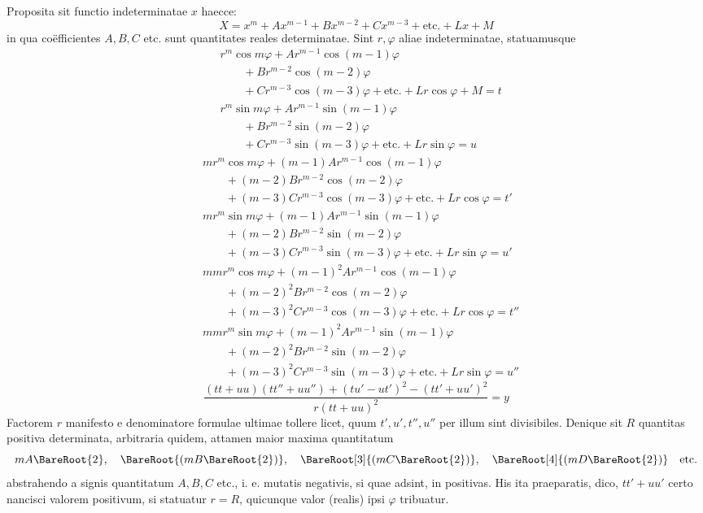 Proposita sit functio indeterminatae $x$ haecce:
\[
X=x^m+Ax^{m-1}+Bx^{m-2}+Cx^{m-3}+\text{etc.}+Lx+M
\]
in qua coëfficientes $A,B,C$ etc. sunt quantitates reales determinatae. Sint $r,\varphi$
aliae indeterminatae, statuamusque
\[
\begin{aligned}
&r^m\cos m\varphi+Ar^{m-1}\cos(m-1)\varphi\\
&\qquad+Br^{m-2}\cos(m-2)\varphi\\
&\qquad+Cr^{m-3}\cos(m-3)\varphi+\text{etc.}+Lr\cos\varphi+M=t\\
&r^m\sin m\varphi+Ar^{m-1}\sin(m-1)\varphi\\
&\qquad+Br^{m-2}\sin(m-2)\varphi\\
&\qquad+Cr^{m-3}\sin(m-3)\varphi+\text{etc.}+Lr\sin\varphi=u
\end{aligned}
\]
\[
\begin{aligned}
&mr^m\cos m\varphi+(m-1)Ar^{m-1}\cos(m-1)\varphi\\
&\qquad+(m-2)Br^{m-2}\cos(m-2)\varphi\\
&\qquad+(m-3)Cr^{m-3}\cos(m-3)\varphi+\text{etc.}+Lr\cos\varphi=t'\\
&mr^m\sin m\varphi+(m-1)Ar^{m-1}\sin(m-1)\varphi\\
&\qquad+(m-2)Br^{m-2}\sin(m-2)\varphi\\
&\qquad+(m-3)Cr^{m-3}\sin(m-3)\varphi+\text{etc.}+Lr\sin\varphi=u'\\[6pt]
&mmr^m\cos m\varphi+(m-1)^2Ar^{m-1}\cos(m-1)\varphi\\
&\qquad+(m-2)^2Br^{m-2}\cos(m-2)\varphi\\
&\qquad+(m-3)^2Cr^{m-3}\cos(m-3)\varphi+\text{etc.}+Lr\cos\varphi=t''\\
&mmr^m\sin m\varphi+(m-1)^2Ar^{m-1}\sin(m-1)\varphi\\
&\qquad+(m-2)^2Br^{m-2}\sin(m-2)\varphi\\
&\qquad+(m-3)^2Cr^{m-3}\sin(m-3)\varphi+\text{etc.}+Lr\sin\varphi=u''
\end{aligned}
\]
\[
\frac{(tt+uu)(tt''+uu'')+(tu'-ut')^2-(tt'+uu')^2}{r(tt+uu)^2}=y
\]
Factorem $r$ manifesto e denominatore formulae ultimae tollere licet, quum
$t',u',t'',u''$ per illum sint divisibiles. Denique sit $R$ quantitas positiva determinata, arbitraria quidem, attamen maior maxima quantitatum
\[
mA\BareRoot{2},\quad\BareRoot{(mB\BareRoot{2})},\quad\BareRoot[3]{(mC\BareRoot{2})},\quad\BareRoot[4]{(mD\BareRoot{2})}\quad\text{etc.}
\]
abstrahendo a signis quantitatum $A,B,C$ etc., i. e. mutatis negativis, si quae
adsint, in positivas. His ita praeparatis, dico, $tt'+uu'$ certo nancisci valorem
positivum, si statuatur $r=R$, quicunque valor (realis) ipsi $\varphi$ tribuatur.

